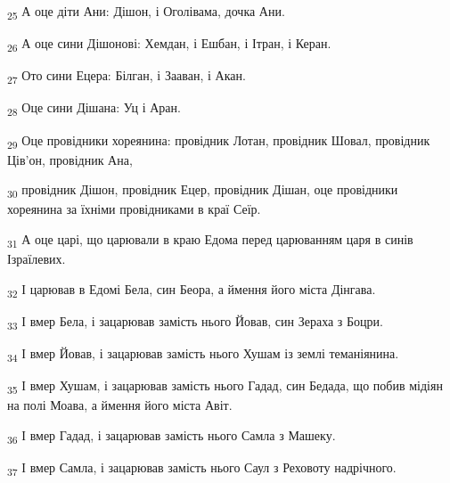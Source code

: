 \begin{tcolorbox}
\textsubscript{25} А оце діти Ани: Дішон, і Оголівама, дочка Ани.
\end{tcolorbox}
\begin{tcolorbox}
\textsubscript{26} А оце сини Дішонові: Хемдан, і Ешбан, і Ітран, і Керан.
\end{tcolorbox}
\begin{tcolorbox}
\textsubscript{27} Ото сини Ецера: Білган, і Зааван, і Акан.
\end{tcolorbox}
\begin{tcolorbox}
\textsubscript{28} Оце сини Дішана: Уц і Аран.
\end{tcolorbox}
\begin{tcolorbox}
\textsubscript{29} Оце провідники хореянина: провідник Лотан, провідник Шовал, провідник Ців'он, провідник Ана,
\end{tcolorbox}
\begin{tcolorbox}
\textsubscript{30} провідник Дішон, провідник Ецер, провідник Дішан, оце провідники хореянина за їхніми провідниками в краї Сеїр.
\end{tcolorbox}
\begin{tcolorbox}
\textsubscript{31} А оце царі, що царювали в краю Едома перед царюванням царя в синів Ізраїлевих.
\end{tcolorbox}
\begin{tcolorbox}
\textsubscript{32} І царював в Едомі Бела, син Беора, а ймення його міста Дінгава.
\end{tcolorbox}
\begin{tcolorbox}
\textsubscript{33} І вмер Бела, і зацарював замість нього Йовав, син Зераха з Боцри.
\end{tcolorbox}
\begin{tcolorbox}
\textsubscript{34} І вмер Йовав, і зацарював замість нього Хушам із землі теманіянина.
\end{tcolorbox}
\begin{tcolorbox}
\textsubscript{35} І вмер Хушам, і зацарював замість нього Гадад, син Бедада, що побив мідіян на полі Моава, а ймення його міста Авіт.
\end{tcolorbox}
\begin{tcolorbox}
\textsubscript{36} І вмер Гадад, і зацарював замість нього Самла з Машеку.
\end{tcolorbox}
\begin{tcolorbox}
\textsubscript{37} І вмер Самла, і зацарював замість нього Саул з Реховоту надрічного.
\end{tcolorbox}
